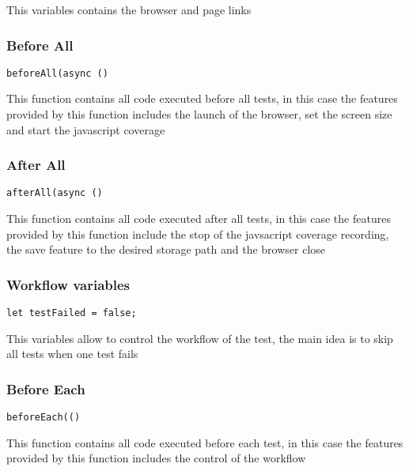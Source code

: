 \documentclass[a4paper]{article}
\begin{document}
This variables contains the browser and page links

\hypertarget{toc700}{}
\subsubsection{Before All}

\begin{lstlisting}
beforeAll(async ()
\end{lstlisting}

This function contains all code executed before all tests, in this case the
features provided by this function includes the launch of the browser, set
the screen size and start the javascript coverage

\hypertarget{toc701}{}
\subsubsection{After All}

\begin{lstlisting}
afterAll(async ()
\end{lstlisting}

This function contains all code executed after all tests, in this case the
features provided by this function include the stop of the javsacript coverage
recording, the save feature to the desired storage path and the browser close

\hypertarget{toc702}{}
\subsubsection{Workflow variables}

\begin{lstlisting}
let testFailed = false;
\end{lstlisting}

This variables allow to control the workflow of the test, the main idea is to
skip all tests when one test fails

\hypertarget{toc703}{}
\subsubsection{Before Each}

\begin{lstlisting}
beforeEach(()
\end{lstlisting}

This function contains all code executed before each test, in this case the
features provided by this function includes the control of the workflow
\end{document}
